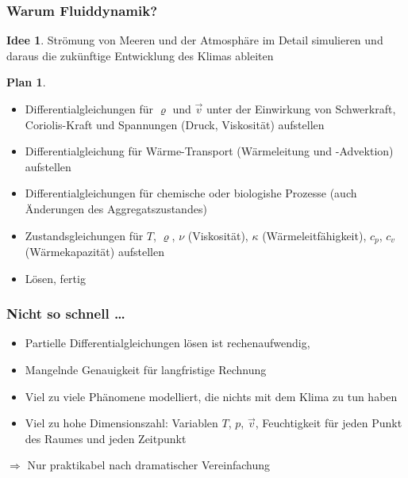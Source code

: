 %
%
%
\theoremstyle{definition}
\newtheorem{idee}{Idee}
\newtheorem{plan}{Plan}
\newtheorem{kont}{Kontinuitätsgleichung}
\newtheorem{impulserhaltung}{Impulserhaltung}
\newtheorem{ink}{Kompressibilität bewirkt}
\newtheorem{boussinesq}{Boussinesq-Approximation}
\newtheorem{rot}{Rotation}
\newtheorem{sfkt}{Strömungsfunktion}
\newtheorem{divergenz}{Divergenzfreiheit}
\newtheorem{navier}{Navier-Stokes-Gleichung}
\newtheorem{beisp}{Beispiel: Lorenz-Modell}
\newtheorem{anomalie}{Anomalie}




%
%
\begin{frame}
\frametitle{Warum Fluiddynamik?}
\begin{idee}
Strömung von Meeren und der Atmosphäre im Detail simulieren und
daraus die zukünftige Entwicklung des Klimas ableiten
\end{idee}
\pause
\begin{plan}
\begin{itemize}[<+->]
\item
Differentialgleichungen für $\varrho$ und $\vec v$ unter der Einwirkung
von Schwerkraft, Coriolis-Kraft und Spannungen (Druck, Viskosität)
aufstellen
\item
Differentialgleichung für Wärme-Transport (Wärmeleitung und -Advektion)
aufstellen
\item
Differentialgleichungen für chemische oder biologishe Prozesse
(auch Änderungen des Aggregatszustandes)
\item
Zustandsgleichungen für $T$, $\varrho$, $\nu$ (Viskosität),
$\kappa$ (Wärmeleitfähigkeit), $c_p$, $c_v$ (Wärmekapazität)
aufstellen
\item
Lösen, fertig \smiley{}
\end{itemize}
\end{plan}

\end{frame}

%
%
\begin{frame}
\frametitle{Nicht so schnell \dots}
\begin{itemize}[<+->]
\item
Partielle Differentialgleichungen lösen ist rechenaufwendig,
\item
Mangelnde Genauigkeit für langfristige Rechnung
\item
Viel zu viele Phänomene modelliert, die nichts mit dem Klima zu tun haben
\item
Viel zu hohe Dimensionszahl: Variablen $T$, $p$, $\vec v$, Feuchtigkeit
für jeden Punkt des Raumes und jeden Zeitpunkt
\end{itemize}
\pause
$\Rightarrow$ Nur praktikabel nach dramatischer Vereinfachung
\end{frame}

